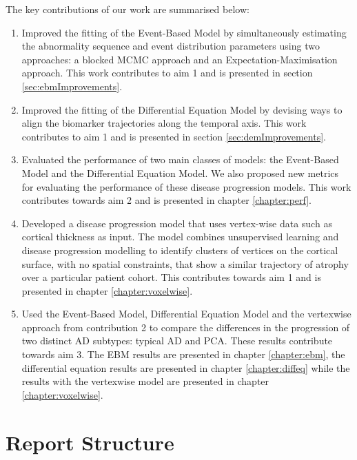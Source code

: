 The key contributions of our work are summarised below:
\begin{enumerate}
 \item Improved the fitting of the Event-Based Model by simultaneously estimating the abnormality sequence and event distribution parameters using two approaches: a blocked MCMC approach and an Expectation-Maximisation approach. This work contributes to aim 1 and is presented in section \ref{sec:ebmImprovements}. 
 \item Improved the fitting of the Differential Equation Model by devising ways to align the biomarker trajectories along the temporal axis. This work contributes to aim 1 and is presented in section \ref{sec:demImprovements}. 
 \item Evaluated the performance of two main classes of models: the Event-Based Model and the Differential Equation Model. We also proposed new metrics for evaluating the performance of these disease progression models. This work contributes towards aim 2 and is presented in chapter \ref{chapter:perf}. 
 \item Developed a disease progression model that uses vertex-wise data such as cortical thickness as input. The model combines unsupervised learning and disease progression modelling to identify clusters of vertices on the cortical surface, with no spatial constraints, that show a similar trajectory of atrophy over a particular patient cohort. This contributes towards aim 1 and is presented in chapter \ref{chapter:voxelwise}.
 \item Used the Event-Based Model, Differential Equation Model and the vertexwise approach from contribution 2 to compare the differences in the progression of two distinct AD subtypes: typical AD and PCA. These results contribute towards aim 3. The EBM results are presented in chapter \ref{chapter:ebm}, the differential equation results are presented in chapter \ref{chapter:diffeq} while the results with the vertexwise model are presented in chapter \ref{chapter:voxelwise}.
\end{enumerate}

\section{Report Structure}

